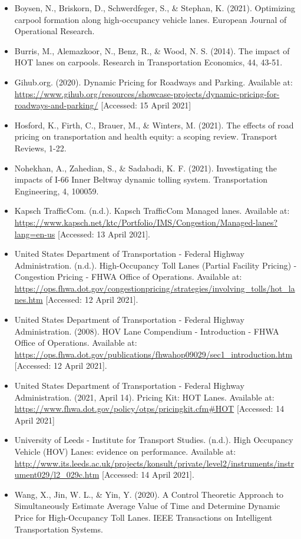 \documentclass[
]{book}
\providecommand{\tightlist}{%
  \setlength{\itemsep}{0pt}\setlength{\parskip}{0pt}}
\begin{document}
\begin{itemize}
\tightlist
\item
  Boysen, N., Briskorn, D., Schwerdfeger, S., \& Stephan, K. (2021). Optimizing carpool formation along high-occupancy vehicle lanes. European Journal of Operational Research.
\item
  Burris, M., Alemazkoor, N., Benz, R., \& Wood, N. S. (2014). The impact of HOT lanes on carpools. Research in Transportation Economics, 44, 43-51.
\item
  Gihub.org. (2020). Dynamic Pricing for Roadways and Parking. Available at: \url{https://www.gihub.org/resources/showcase-projects/dynamic-pricing-for-roadways-and-parking/} {[}Accessed: 15 April 2021{]}
\item
  Hosford, K., Firth, C., Brauer, M., \& Winters, M. (2021). The effects of road pricing on transportation and health equity: a scoping review. Transport Reviews, 1-22.
\item
  Nohekhan, A., Zahedian, S., \& Sadabadi, K. F. (2021). Investigating the impacts of I-66 Inner Beltway dynamic tolling system. Transportation Engineering, 4, 100059.
\item
  Kapsch TrafficCom. (n.d.). Kapsch TrafficCom \textbar{} Managed lanes. Available at: \url{https://www.kapsch.net/ktc/Portfolio/IMS/Congestion/Managed-lanes?lang=en-us} {[}Accessed: 13 April 2021{]}.
\item
  United States Department of Transportation - Federal Highway Administration. (n.d.). High-Occupancy Toll Lanes (Partial Facility Pricing) - Congestion Pricing - FHWA Office of Operations. Available at: \url{https://ops.fhwa.dot.gov/congestionpricing/strategies/involving_tolls/hot_lanes.htm} {[}Accessed: 12 April 2021{]}.
\item
  United States Department of Transportation - Federal Highway Administration. (2008). HOV Lane Compendium - Introduction - FHWA Office of Operations. Available at: \url{https://ops.fhwa.dot.gov/publications/fhwahop09029/sec1_introduction.htm} {[}Accessed: 12 April 2021{]}.
\item
  United States Department of Transportation - Federal Highway Administration. (2021, April 14). Pricing Kit: HOT Lanes. Available at: \url{https://www.fhwa.dot.gov/policy/otps/pricingkit.cfm\#HOT} {[}Accessed: 14 April 2021{]}
\item
  University of Leeds - Institute for Transport Studies. (n.d.). High Occupancy Vehicle (HOV) Lanes: evidence on performance. Available at: \url{http://www.its.leeds.ac.uk/projects/konsult/private/level2/instruments/instrument029/l2_029c.htm} {[}Accessed: 14 April 2021{]}.
\item
  Wang, X., Jin, W. L., \& Yin, Y. (2020). A Control Theoretic Approach to Simultaneously Estimate Average Value of Time and Determine Dynamic Price for High-Occupancy Toll Lanes. IEEE Transactions on Intelligent Transportation Systems.
\end{itemize}
\end{document}
